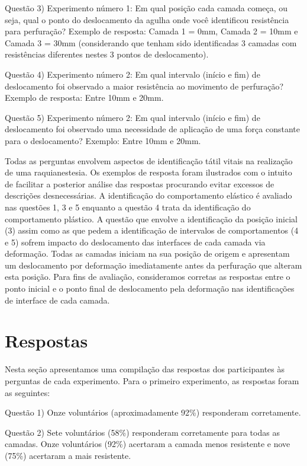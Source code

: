 Questão 3) Experimento número 1: Em qual posição cada camada começa, ou seja, qual o ponto do deslocamento da agulha onde você identificou resistência para perfuração? 
Exemplo de resposta: Camada 1 = 0mm, Camada 2 = 10mm e Camada 3 = 30mm (considerando que tenham sido identificadas 3 camadas com resistências diferentes nestes 3 pontos de deslocamento).

Questão 4) Experimento número 2: Em qual intervalo (início e fim) de deslocamento foi observado a maior resistência ao movimento de perfuração? 
Exemplo de resposta: Entre 10mm e 20mm.

Questão 5) Experimento número 2: Em qual intervalo (início e fim) de deslocamento foi observado uma necessidade de aplicação de uma força constante para o deslocamento? 
Exemplo: Entre 10mm e 20mm.

Todas as perguntas envolvem aspectos de identificação tátil vitais na realização de uma raquianestesia. Os exemplos de resposta foram ilustrados com o intuito de facilitar a posterior análise das respostas procurando evitar excessos de descrições desnecessárias. A identificação do comportamento elástico é avaliado nas questões 1, 3 e 5 enquanto a questão 4 trata da identificação do comportamento plástico. A questão que envolve a identificação da posição inicial (3) assim como as que pedem a identificação de intervalos de comportamentos (4 e 5) sofrem impacto do deslocamento das interfaces de cada camada via deformação. Todas as camadas iniciam na sua posição de origem e apresentam um deslocamento por deformação imediatamente antes da perfuração que alteram esta posição. Para fins de avaliação, consideramos corretas as respostas entre o ponto inicial e o ponto final de deslocamento pela deformação nas identificações de interface de cada camada.  

\section{Respostas}
\label{sec:respostas}

Nesta seção apresentamos uma compilação das respostas dos participantes às perguntas de cada experimento. Para o primeiro
experimento, as respostas foram as seguintes:

Questão 1) Onze voluntários (aproximadamente 92\%) responderam corretamente.

Questão 2) Sete voluntários (58\%) responderam corretamente para todas as camadas. Onze voluntários (92\%) acertaram a camada menos resistente e nove (75\%) acertaram a mais resistente.

